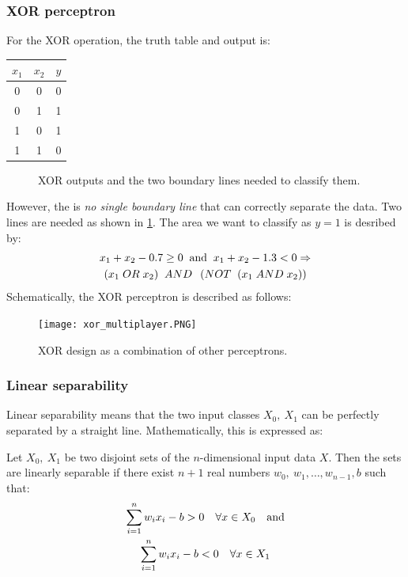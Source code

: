 \documentclass[a4paper]{article}
\begin{document}
\subsubsection{XOR perceptron}
For the XOR operation, the truth table and output is:
\begin{multicols}{2}
\begin{center}
\begin{tabular}{c|c|c}
$x_1$ & $x_2$ & $y$ \\
\hline
0 & 0 & 0\\
0 & 1 & 1\\
1 & 0 & 1\\
1 & 1 & 0
\end{tabular}
\end{center}

\columnbreak
\begin{figure}[H]
    \centering
    
    \caption{XOR outputs and the two boundary lines needed to classify them.}
    \label{fig:xor_input_output}
\end{figure}

\end{multicols}
However, the is \textit{no single boundary line} that can correctly separate the data. Two lines are needed as shown in \ref{fig:xor_input_output}. The area we want to classify as $y=1$ is desribed by:
\begin{gather*}
x_1 + x_2 -0.7 \geq 0 \;\; \textup{and} \;\; x_1 + x_2 -1.3 <0 \Rightarrow\\
(x_1 \; OR \; x_2) \;\; AND \;\; \left(NOT \;\; (x_1 \; AND \; x_2)\right)
\end{gather*}
Schematically, the XOR perceptron is described as follows:
\begin{figure}[H]
    \centering
    \texttt{[image: xor\_multiplayer.PNG]}
    \caption{XOR design as a combination of other perceptrons.}
\end{figure}


\subsubsection{Linear separability}

Linear separability means that the two input classes $X_0,\ X_1$ can be perfectly separated by a straight line. Mathematically, this is expressed as:
\begin{definition}
Let $X_0,\ X_1$ be two disjoint sets of the $n$-dimensional input data $X$. Then the sets are linearly separable if there exist $n+1$ real numbers $w_0,\ w_1, \ldots, w_{n-1}, b$ such that:
    \begin{gather}
      \sum_{i=1}^{n}{w_ix_i} - b > 0 \quad \forall x \in X_0  \quad \textup{and}\\
      \sum_{i=1}^{n}{w_ix_i} - b < 0 \quad \forall x \in X_1
    \end{gather}
\end{definition}
\end{document}
